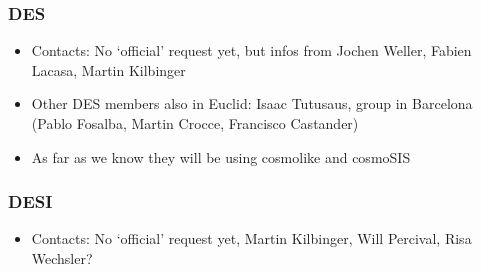 \subsubsection{DES}

\begin{itemize}
\item Contacts: No ‘official’ request yet, but infos from Jochen Weller, Fabien Lacasa, Martin Kilbinger
\item Other DES members also in Euclid: Isaac Tutusaus, group in Barcelona (Pablo Fosalba, Martin Crocce, Francisco Castander)
\item As far as we know they will be using cosmolike and cosmoSIS
\end{itemize}



\subsubsection{DESI}

\begin{itemize}
\item Contacts: No ‘official’ request yet, Martin Kilbinger, Will Percival, Risa Wechsler?
\end{itemize}



